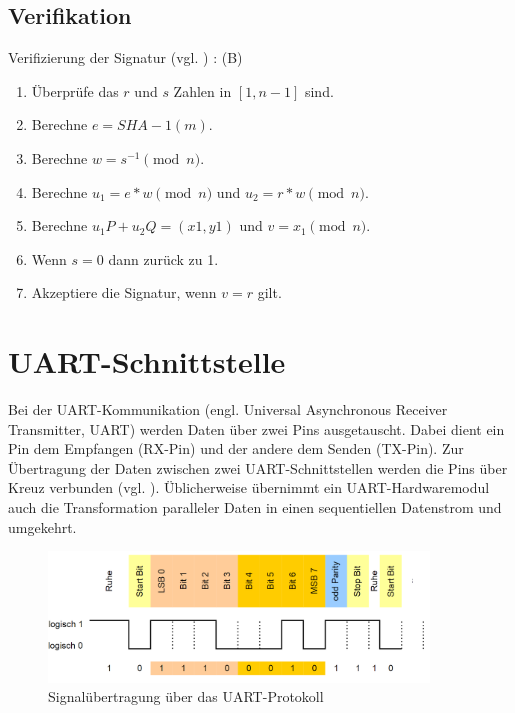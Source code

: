 \subsection{Verifikation}
Verifizierung der Signatur (vgl. \cite{hwimp}) : (B)

\begin{enumerate}
\item Überprüfe das $r$ und $s$ Zahlen in $[1, n - 1]$ sind.
\item Berechne $e = SHA - 1(m)$.
\item Berechne $w = s^{-1}\pmod{n}$.
\item Berechne $u_1 = e * w \pmod{n}$ und $u_2 = r * w \pmod{n}$.
\item Berechne $u_1 P + u_2 Q = (x1, y1)$ und $v = x_1 \pmod{n}$.
\item Wenn $s = 0$ dann zurück zu 1.
\item Akzeptiere die Signatur, wenn $v = r$ gilt.
\end{enumerate}






\section{UART-Schnittstelle} \label{sec:iuart}

Bei der UART-Kommunikation (engl. Universal Asynchronous Receiver Transmitter, UART) werden Daten über zwei Pins ausgetauscht. Dabei dient ein Pin dem Empfangen (RX-Pin) und der andere dem Senden (TX-Pin). Zur Übertragung der Daten zwischen zwei UART-Schnittstellen werden die Pins über Kreuz verbunden (vgl. \cite{uart}). Üblicherweise übernimmt ein UART-Hardwaremodul auch die Transformation paralleler Daten in einen sequentiellen Datenstrom und umgekehrt.

\begin{figure}[H]
	\centering
   \includegraphics[width=0.90\textwidth]{bilder/uart}
	\caption{Signalübertragung über das UART-Protokoll}
	\label{fig:uart}
\end{figure}

